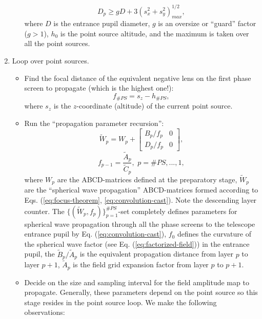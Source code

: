 \begin{enumerate}
\begin{itemize}
\begin{equation}
      D_{p} \geq g D + 3 (s_{x}^{2}+s_{y}^{2})^{1/2}_{max},
    \end{equation}
    where $D$ is the entrance pupil diameter, $g$ is an oversize or ``guard''
    factor ($g > 1$), $h_{0}$ is the point source
    altitude, and the maximum is taken over all the point sources.
  \end{itemize}
  \item Loop over point sources.
  \begin{itemize}
    \item Find the focal distance of the equivalent negative lens on the first
    phase screen to propagate (which is the highest one!):
    \begin{equation} \label{eq:initial-f}
      f_{\#PS} = s_{z}-h_{\#PS},
    \end{equation}
    where $s_{z}$ is the $z$-coordinate (altitude) of the current point source.
    \item Run the ``propagation parameter recursion'':
    \begin{equation} \label{eq:W-recursion}
      \tilde{W}_{p} = W_{p} +
      \left[
      \begin{array}{cc} B_{p}/f_{p} & 0 \\ D_{p}/f_{p} & 0 \end{array}
      \right],
    \end{equation}
    $$ f_{p-1} = \frac{\tilde{A}_{p}}{\tilde{C}_{p}}, \,\, p = \#PS,...,1, $$
    where $W_{p}$ are the ABCD-matrices defined at the preparatory stage,
    $\tilde{W}_{p}$ are the ``spherical wave propagation'' ABCD-matrices
    formed according to Eqs. (\ref{eq:focus-theorem},
    \ref{eq:convolution-cast}). Note the descending layer counter. The
    $\{ (\tilde{W}_{p},f_{p}) \}_{p=1}^{\#PS}$-set
    completely defines parameters for spherical wave propagation through all
    the phase screens to the telescope entrance pupil by Eq.
    (\ref{eq:convolution-cast}), $f_{0}$ defines the curvature of the
    spherical wave factor (see Eq. (\ref{eq:factorized-field})) in the
    entrance pupil, the $\tilde{B}_{p}/\tilde{A}_{p}$ is the equivalent
    propagation distance from layer $p$ to layer $p+1$, $\tilde{A}_{p}$ is the
    field grid expansion factor from layer $p$ to $p+1$.
    \item Decide on the size and sampling interval for the field amplitude map
    to propagate. Generally, these parameters depend on the point source so
    this stage resides in the point source loop. We make the following
    observations:
    \begin{itemize}

\end{itemize}
\end{itemize}
\end{enumerate}
